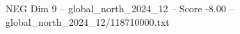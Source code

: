 \begin{textsample}{NEG Dim 9 – global\_north\_2024\_12 – Score -8.00 – global\_north\_2024\_12/118710000.txt}
\end{textsample}
